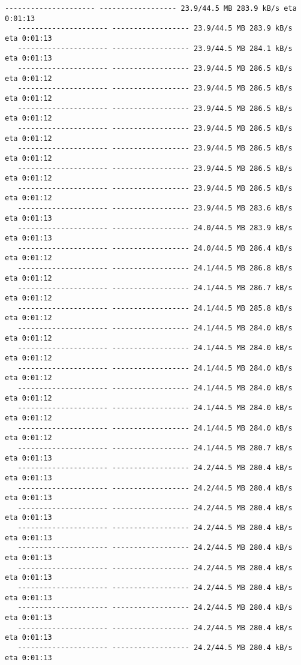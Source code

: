 \documentclass[11pt]{article}
\begin{document}
\begin{Verbatim}[commandchars=\\\{\}]
   --------------------- ------------------ 23.9/44.5 MB 283.9 kB/s eta 0:01:13
   --------------------- ------------------ 23.9/44.5 MB 283.9 kB/s eta 0:01:13
   --------------------- ------------------ 23.9/44.5 MB 284.1 kB/s eta 0:01:13
   --------------------- ------------------ 23.9/44.5 MB 286.5 kB/s eta 0:01:12
   --------------------- ------------------ 23.9/44.5 MB 286.5 kB/s eta 0:01:12
   --------------------- ------------------ 23.9/44.5 MB 286.5 kB/s eta 0:01:12
   --------------------- ------------------ 23.9/44.5 MB 286.5 kB/s eta 0:01:12
   --------------------- ------------------ 23.9/44.5 MB 286.5 kB/s eta 0:01:12
   --------------------- ------------------ 23.9/44.5 MB 286.5 kB/s eta 0:01:12
   --------------------- ------------------ 23.9/44.5 MB 286.5 kB/s eta 0:01:12
   --------------------- ------------------ 23.9/44.5 MB 283.6 kB/s eta 0:01:13
   --------------------- ------------------ 24.0/44.5 MB 283.9 kB/s eta 0:01:13
   --------------------- ------------------ 24.0/44.5 MB 286.4 kB/s eta 0:01:12
   --------------------- ------------------ 24.1/44.5 MB 286.8 kB/s eta 0:01:12
   --------------------- ------------------ 24.1/44.5 MB 286.7 kB/s eta 0:01:12
   --------------------- ------------------ 24.1/44.5 MB 285.8 kB/s eta 0:01:12
   --------------------- ------------------ 24.1/44.5 MB 284.0 kB/s eta 0:01:12
   --------------------- ------------------ 24.1/44.5 MB 284.0 kB/s eta 0:01:12
   --------------------- ------------------ 24.1/44.5 MB 284.0 kB/s eta 0:01:12
   --------------------- ------------------ 24.1/44.5 MB 284.0 kB/s eta 0:01:12
   --------------------- ------------------ 24.1/44.5 MB 284.0 kB/s eta 0:01:12
   --------------------- ------------------ 24.1/44.5 MB 284.0 kB/s eta 0:01:12
   --------------------- ------------------ 24.1/44.5 MB 280.7 kB/s eta 0:01:13
   --------------------- ------------------ 24.2/44.5 MB 280.4 kB/s eta 0:01:13
   --------------------- ------------------ 24.2/44.5 MB 280.4 kB/s eta 0:01:13
   --------------------- ------------------ 24.2/44.5 MB 280.4 kB/s eta 0:01:13
   --------------------- ------------------ 24.2/44.5 MB 280.4 kB/s eta 0:01:13
   --------------------- ------------------ 24.2/44.5 MB 280.4 kB/s eta 0:01:13
   --------------------- ------------------ 24.2/44.5 MB 280.4 kB/s eta 0:01:13
   --------------------- ------------------ 24.2/44.5 MB 280.4 kB/s eta 0:01:13
   --------------------- ------------------ 24.2/44.5 MB 280.4 kB/s eta 0:01:13
   --------------------- ------------------ 24.2/44.5 MB 280.4 kB/s eta 0:01:13
   --------------------- ------------------ 24.2/44.5 MB 280.4 kB/s eta 0:01:13

\end{Verbatim}
\end{document}

